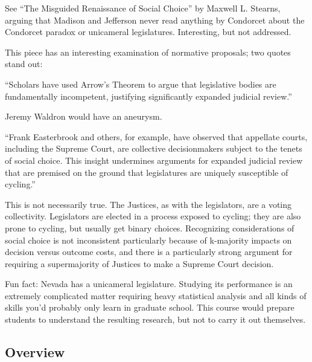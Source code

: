 \begin{boxcomment}
    See ``The Misguided Renaissance of Social Choice'' by Maxwell L. Stearns, arguing that Madison and Jefferson never read anything by Condorcet about the Condorcet paradox or unicameral legislatures.  Interesting, but not addressed.

    This piece has an interesting examination of normative proposals; two quotes stand out:

    ``Scholars have used Arrow's Theorem to argue that legislative bodies are fundamentally incompetent, justifying significantly expanded judicial review.''

    Jeremy Waldron would have an aneurysm.

    ``Frank Easterbrook and others, for example, have observed that appellate courts, including the Supreme Court, are collective decisionmakers subject to the tenets of social choice.  This insight undermines arguments for expanded judicial review that are premised on the ground that legislatures are uniquely susceptible of cycling.''

    This is not necessarily true.  The Justices, as with the legislators, are a voting collectivity.  Legislators are elected in a process exposed to cycling; they are also prone to cycling, but usually get binary choices.  Recognizing considerations of social choice is not inconsistent particularly because of k-majority impacts on decision versus outcome costs, and there is a particularly strong argument for requiring a supermajority of Justices to make a Supreme Court decision.
\end{boxcomment}

\begin{boxcomment}
    Fun fact:  Nevada has a unicameral legislature.  Studying its performance is an extremely complicated matter requiring heavy statistical analysis and all kinds of skills you'd probably only learn in graduate school.  This course would prepare students to understand the resulting research, but not to carry it out themselves.
\end{boxcomment}

\subsection{Overview}

